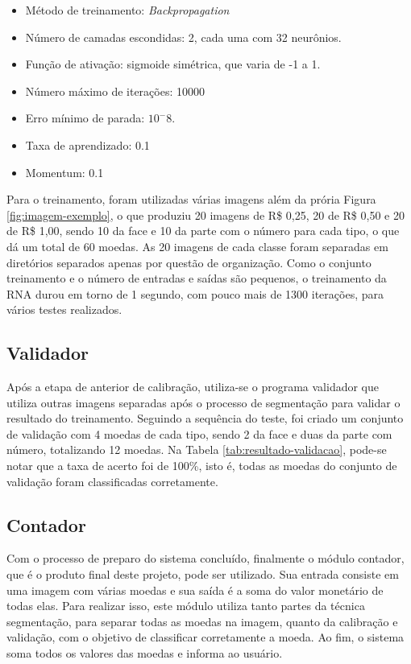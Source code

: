 \documentclass[10pt,journal,compsoc]{IEEEtran}
\begin{document}
\begin{itemize}  
\item Método de treinamento: \textit{Backpropagation}
\item Número de camadas escondidas: 2, cada uma com 32 neurônios.
\item Função de ativação: sigmoide simétrica, que varia de -1 a 1.
\item Número máximo de iterações: 10000
\item Erro mínimo de parada:  $10 ^ -8$.
\item Taxa de aprendizado: 0.1
\item Momentum: 0.1
\end{itemize}

Para o treinamento, foram utilizadas várias imagens além da prória Figura \ref{fig:imagem-exemplo}, o que produziu  20 imagens de R\$ 0,25, 20 de R\$ 0,50 e 20 de R\$ 1,00, sendo 10 da face e 10 da parte com o número para cada tipo, o que dá um total de 60 moedas. As 20 imagens de cada classe foram separadas em diretórios separados apenas por questão de organização. Como o conjunto treinamento e o número de entradas e saídas são pequenos, o treinamento da RNA durou em torno de 1 segundo, com pouco mais de 1300 iterações, para vários testes realizados.

\subsection{Validador}
\label{sec:validador}

Após a etapa de anterior de calibração, utiliza-se o programa validador que utiliza outras imagens separadas após o processo de segmentação para validar o resultado do treinamento. Seguindo a sequência do teste, foi criado um conjunto de validação com 4 moedas de cada tipo, sendo 2 da face e duas da parte com número, totalizando 12 moedas. Na Tabela \ref{tab:resultado-validacao}, pode-se notar que a taxa de acerto foi de 100\%, isto é, todas as moedas do conjunto de validação foram classificadas corretamente.

\subsection{Contador}
\label{sec:contador}


Com o processo de preparo do sistema concluído, finalmente o módulo contador, que é o produto final deste projeto, pode ser utilizado. Sua entrada consiste em uma imagem com várias moedas e sua saída é a soma do valor monetário de todas elas. Para realizar isso, este módulo utiliza tanto partes da técnica segmentação, para separar todas as moedas na imagem, quanto da calibração e validação, com o objetivo de classificar corretamente a moeda. Ao fim, o sistema soma todos os valores das moedas e informa ao usuário.
\end{document}

